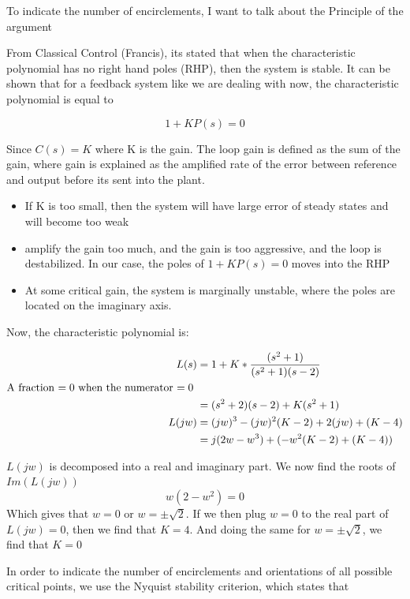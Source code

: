 \documentclass[12pt,A4, onecolumn]{exam}
\begin{document}
\begin{questions}
\begin{parts}
\begin{solution}
  To indicate the number of encirclements, I want to talk about the Principle of the argument

  From Classical Control (Francis), its stated that when the characteristic polynomial has no right hand poles (RHP), then the system is stable. It can be shown that for a feedback system like we are dealing with now, the characteristic polynomial is equal to

  \[
     1 + KP(s) = 0
  \] 

  Since $ C(s) = K $ where K is the gain. The loop gain is defined as the sum of the gain, where gain is explained as the amplified rate of the error between reference and output before its sent into the plant. 
  
  \begin{itemize}
    \item If K is too small, then the system will have large error of steady states and will become too weak
    \item amplify the gain too much, and the gain is too aggressive, and the loop is destabilized. In our case, the poles of $ 1+KP(s)=0 $ moves into the RHP 
    \item At some critical gain, the system is marginally unstable, where the poles are located on the imaginary axis.
  \end{itemize}
  

  Now, the characteristic polynomial is:

  \begin{align*}
    L(s) &= 1 + K * \frac{(s^2+1)} {(s^2+1)(s-2)} \\
    \text{A fraction $ =0 $ when the numerator $ =0 $  }\\
    &= (s^2+2)(s-2) + K(s^2+1)  \\
    L(jw) &= (jw)^3-(jw)^2(K-2)+2(jw) + (K-4) \\
    &= j(2w-w^3) + (-w^2(K-2) + (K-4))
  \end{align*}

  $ L(jw) $ is decomposed into a real and imaginary part. We now find the roots of $ Im(L(jw)) $
  \[
     w(2-w^2) = 0
  \] 
  Which gives that $w = 0$ or $w = \pm \sqrt{2}$. If we then plug $ w = 0 $ to the real part of $ L(jw) = 0 $, then we find that $ K=4 $. And doing the same for $ w = \pm \sqrt{2} $, we find that $ K=0 $ 
  

  In order to indicate the number of encirclements and orientations of all possible critical points, we use the Nyquist stability criterion, which states that 


\end{solution}
\end{parts}
\end{questions}
\end{document}
